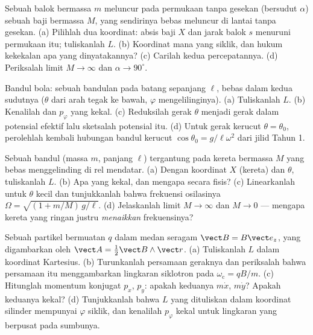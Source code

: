 \begin{exercise}[$\star\star$]\label{exo:b3:lagrangian-mechanics:5}
Sebuah balok bermassa $m$ meluncur pada permukaan tanpa gesekan (bersudut
$\alpha$) sebuah baji bermassa $M$, yang sendirinya bebas meluncur di
lantai tanpa gesekan. (a) Pilihlah dua koordinat: absis baji $X$ dan
jarak balok $s$ menuruni permukaan itu; tuliskanlah $L$. (b) Koordinat
mana yang siklik, dan hukum kekekalan apa yang dinyatakannya? (c)
Carilah kedua percepatannya. (d) Periksalah limit $M \to \infty$ dan
$\alpha \to
90^\circ$.
\end{exercise}

\begin{exercise}[$\star\star$]\label{exo:b3:lagrangian-mechanics:6}
Bandul bola: sebuah bandulan pada batang sepanjang $\ell$, bebas dalam
kedua sudutnya ($\theta$ dari arah tegak ke bawah, $\varphi$
mengelilinginya). (a) Tuliskanlah $L$. (b) Kenalilah 
dan $p_\varphi$ yang kekal. (c) Reduksilah gerak $\theta$ menjadi gerak
dalam potensial efektif lalu sketsalah potensial itu. (d) Untuk gerak
kerucut $\theta =
\theta_0$, perolehlah kembali hubungan bandul kerucut $\cos\theta_0 =
g/\ell\omega^2$ dari jilid Tahun 1.
\end{exercise}

\begin{exercise}[$\star\star$]\label{exo:b3:lagrangian-mechanics:7}
Sebuah bandul (massa $m$, panjang $\ell$) tergantung pada kereta
bermassa $M$ yang bebas menggelinding di rel mendatar. (a) Dengan
koordinat $X$ (kereta) dan $\theta$, tuliskanlah $L$. (b) Apa yang
kekal, dan mengapa secara fisis? (c) Linearkanlah untuk $\theta$ kecil
dan tunjukkanlah bahwa frekuensi osilasinya
$\Omega = \sqrt{(1 + m/M)\,g/\ell}$. (d) Jelaskanlah limit $M \to
\infty$ dan $M \to 0$ --- mengapa kereta yang ringan justru
\emph{menaikkan} frekuensinya?
\end{exercise}

\begin{exercise}[$\star\star$]\label{exo:b3:lagrangian-mechanics:8}
Sebuah partikel bermuatan $q$ dalam medan seragam $\vect B = B\vect e_z$,
yang digambarkan oleh $\vect A = \tfrac12\vect B\wedge\vect r$. (a)
Tuliskanlah $L$ dalam koordinat Kartesius. (b) Turunkanlah persamaan
geraknya dan periksalah bahwa persamaan itu menggambarkan lingkaran
siklotron pada $\omega_{\text{c}} = qB/m$. (c) Hitunglah momentum
konjugat $p_x$, $p_y$: apakah keduanya $m\dot x$, $m\dot y$? Apakah
keduanya kekal? (d) Tunjukkanlah bahwa $L$ yang dituliskan dalam
koordinat silinder mempunyai $\varphi$ siklik, dan kenalilah $p_\varphi$
kekal untuk lingkaran yang berpusat pada sumbunya.
\end{exercise}

